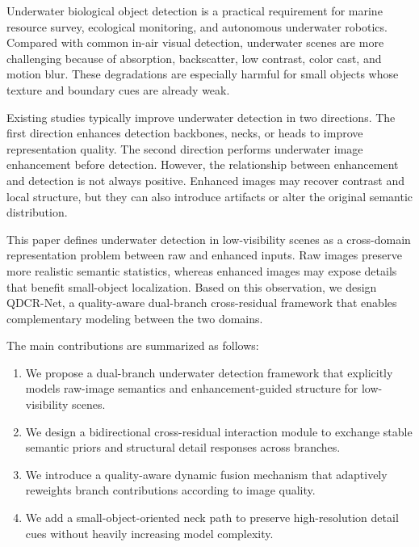 Underwater biological object detection is a practical requirement for marine resource
survey, ecological monitoring, and autonomous underwater robotics. Compared with common
in-air visual detection, underwater scenes are more challenging because of absorption,
backscatter, low contrast, color cast, and motion blur. These degradations are especially
harmful for small objects whose texture and boundary cues are already weak.

Existing studies typically improve underwater detection in two directions. The first
direction enhances detection backbones, necks, or heads to improve representation quality.
The second direction performs underwater image enhancement before detection. However, the
relationship between enhancement and detection is not always positive. Enhanced images may
recover contrast and local structure, but they can also introduce artifacts or alter the
original semantic distribution.

This paper defines underwater detection in low-visibility scenes as a cross-domain
representation problem between raw and enhanced inputs. Raw images preserve more realistic
semantic statistics, whereas enhanced images may expose details that benefit small-object
localization. Based on this observation, we design QDCR-Net, a quality-aware dual-branch
cross-residual framework that enables complementary modeling between the two domains.

The main contributions are summarized as follows:
\begin{enumerate}[leftmargin=*]
  \item We propose a dual-branch underwater detection framework that explicitly models
  raw-image semantics and enhancement-guided structure for low-visibility scenes.
  \item We design a bidirectional cross-residual interaction module to exchange stable
  semantic priors and structural detail responses across branches.
  \item We introduce a quality-aware dynamic fusion mechanism that adaptively reweights
  branch contributions according to image quality.
  \item We add a small-object-oriented neck path to preserve high-resolution detail cues
  without heavily increasing model complexity.
\end{enumerate}
